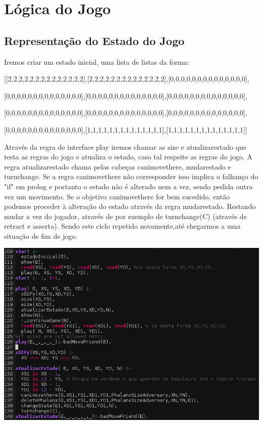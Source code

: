 \documentclass[a4paper]{article}
\begin{document}
\section{Lógica do Jogo}
\subsection{Representação do Estado do Jogo}
\begin{center}
Iremos criar um estado inicial, uma lista de listas da forma:

[[2,2,2,2,2,2,2,2,2,2,2,2,2,2],[2,2,2,2,2,2,2,2,2,2,2,2,2,2],[0,0,0,0,0,0,0,0,0,0,0,0,0,0],

  [0,0,0,0,0,0,0,0,0,0,0,0,0,0],[0,0,0,0,0,0,0,0,0,0,0,0,0,0],[0,0,0,0,0,0,0,0,0,0,0,0,0,0],

  [0,0,0,0,0,0,0,0,0,0,0,0,0,0],[0,0,0,0,0,0,0,0,0,0,0,0,0,0],[0,0,0,0,0,0,0,0,0,0,0,0,0,0],

[0,0,0,0,0,0,0,0,0,0,0,0,0,0],[1,1,1,1,1,1,1,1,1,1,1,1,1,1],[1,1,1,1,1,1,1,1,1,1,1,1,1,1]]
\end{center}
Através da regra de interface play iremos chamar as size e atualizarestado que testa as regras do jogo e atualiza o estado, caso tal respeite as regras do jogo. A regra atualizarestado chama pelas cabeças canimovethere, mudarestado e turnchange. Se a regra canimovethere não corresponder isso implica o falhanço do "if" em prolog e portanto o estado não é alterado nem a vez, sendo pedida outra vez um movimento. Se o objetivo canimovethere for bem sucedido, então podemos proceder à alteração do estado através da regra mudarestado. Restando mudar a vez do jogador, através de por exemplo de turnchange(C) (através de retract e asserta). Sendo este ciclo repetido novamente,até chegarmos a uma situação de fim de jogo.
\begin{center}
  \includegraphics[scale=0.55]{representacao.png}
\end{center}
\end{document}
